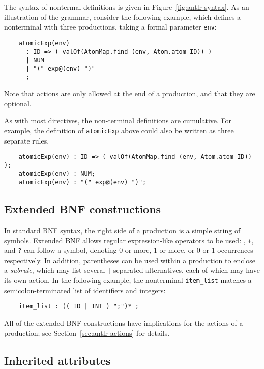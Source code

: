 The syntax of nontermal definitions is given in Figure~\ref{fig:antlr-syntax}.  As an illustration of the grammar, consider the following example, which defines a nonterminal with three productions, taking a formal parameter {\tt env}:
\begin{verbatim}
    atomicExp(env)
      : ID => ( valOf(AtomMap.find (env, Atom.atom ID)) )
      | NUM
      | "(" exp@(env) ")"
      ;
\end{verbatim}
Note that actions are only allowed at the end of a production, and that they are optional.

As with most directives, the non-terminal definitions are cumulative.
For example, the definition of \texttt{atomicExp} above could also be
written as three separate rules.
\begin{verbatim}
    atomicExp(env) : ID => ( valOf(AtomMap.find (env, Atom.atom ID)) );
    atomicExp(env) : NUM;
    atomicExp(env) : "(" exp@(env) ")";
\end{verbatim}

\subsection{Extended BNF constructions}

In standard BNF syntax, the right side of a production is a simple string of symbols.  Extended BNF allows regular expression-like operators to be used: {\tt *}, {\tt +}, and {\tt ?} can follow a symbol, denoting 0 or more, 1 or more, or 0 or 1 occurrences respectively.  In addition, parentheses can be used within a production to enclose a \emph{subrule}, which may list several {\tt |}-separated alternatives, each of which may have its own action.  In the following example, the nonterminal {\tt item\_list} matches a semicolon-terminated list of identifiers and integers:
\begin{verbatim}
    item_list : (( ID | INT ) ";")* ;
\end{verbatim}
All of the extended BNF constructions have implications for the actions of a production; see Section~\ref{sec:antlr-actions} for details.

\subsection{Inherited attributes}\label{sec:inh-attr}

